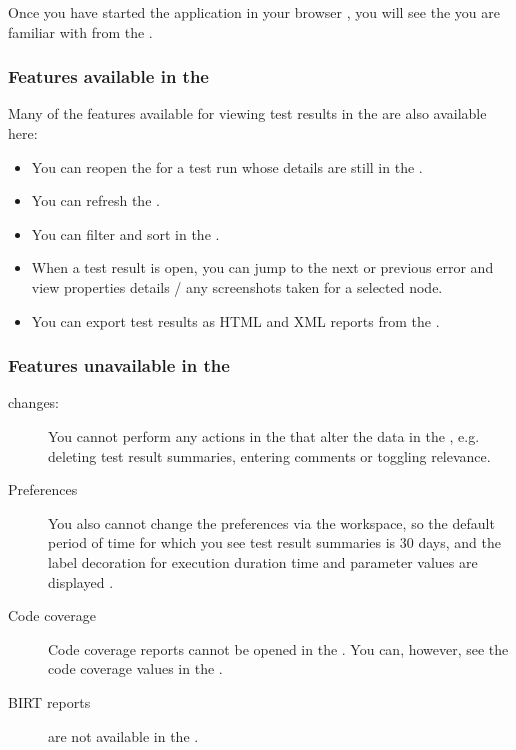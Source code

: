 Once you have started the \dash{} application in your browser , you will see the \reportpersp{} you are familiar with from the \ite{} .

\subsubsection{Features available in the \dash{}}
Many of the features available for viewing test results in the \ite{} are also available here:
\begin{itemize}
\item You can reopen the \gdtestresultview{}  for a test run whose details are still in the \gddb{} .
\item You can refresh the \gdtestsummaryview{} .
\item You can filter and sort in the \gdtestsummaryview{} .
\item When a test result is open, you can jump to the next or previous error  and view properties details / any screenshots taken for a selected node. 
\item You can export test results as HTML and XML reports from the \dash{}. 
\end{itemize}

\subsubsection{Features unavailable in the \dash}
\begin{description}
\item [\gddb{} changes:]{You cannot perform any actions in the \dash{} that alter the data in the \gddb{}, e.g. deleting test result summaries, entering comments or toggling relevance.}
\item[Preferences]{You also cannot change the preferences via the workspace, so the default period of time for which you see test result summaries is 30 days, and the label decoration for execution duration time and parameter values are displayed .}
\item [Code coverage]{Code coverage reports cannot be opened in the \dash{}. You can, however, see the code coverage values in the \gdtestsummaryview{}.}
\item [BIRT reports]{ are not available in the \dash{}.}
\end{description}
